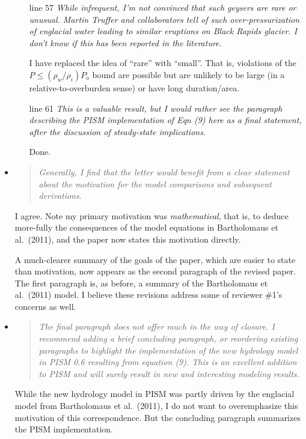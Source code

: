 \documentclass[11pt,reqno]{amsart}
\newcommand{\reply}[2]{
\medskip\medskip
\item  \begin{quote}
\emph{#1}
\end{quote}

\medskip
\noindent #2}
\begin{document}
\begin{itemize}
{\begin{itemize}
\item[line 57]  \emph{While infrequent, I'm not convinced that such geysers are rare or unusual.  Martin Truffer and collaborators tell of such over-pressurization of  englacial water leading to similar eruptions on Black Rapids glacier.   I don't know if this has been reported in the literature.}

\quad I have replaced the idea of ``rare'' with ``small''.  That is, violations of the $P\le (\rho_w/\rho_i) P_o$ bound are possible but are unlikely to be large (in a relative-to-overburden sense) or have long duration/area.

\item[line 61]  \emph{This is a valuable result, but I would rather see the paragraph describing the PISM implementation of Eqn (9) here as a final statement, after the discussion of steady-state implications.}

\quad Done.
\end{itemize}}

\reply{Generally, I find that the letter would benefit from a clear statement about the motivation for the model comparisons and subsequent derivations.}
{I agree.  Note my primary motivation was \emph{mathematical}, that is, to deduce more-fully the consequences of the model equations in Bartholomaus et al.~(2011), and the paper now states this motivation directly.

A much-clearer summary of the goals of the paper, which are easier to state than motivation, now appears as the second paragraph of the revised paper.  The first paragraph is, as before, a summary of the Bartholomaus et al.~(2011) model.  I believe these revisions address some of reviewer \#1's concerns as well.}

\reply{The final paragraph does not offer much in the way of closure.  I recommend adding a brief concluding paragraph, or reordering existing paragraphs to highlight the implementation of the new hydrology model in PISM 0.6 resulting from equation (9).  This is an excellent addition to PISM and will surely result in new and interesting modeling results.}
{While the new hydrology model in PISM was partly driven by the englacial model from Bartholomaus et al.~(2011), I do not want to overemphasize this motivation of this correspondence.  But the concluding paragraph summarizes the PISM implementation.}
\end{itemize}
\end{document}
